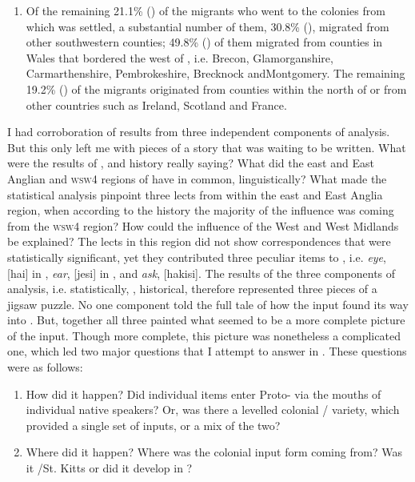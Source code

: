 \begin{enumerate}
\item{Of the remaining 21.1\% ()  of the migrants who went to the colonies from which  was settled, a substantial number of them, 30.8\% (), migrated from other southwestern counties; 49.8\% () of them migrated from counties in Wales that bordered the west of , i.e. Brecon, Glamorganshire, Carmarthenshire, Pembrokeshire, Brecknock and\linebreak Montgomery. The remaining 19.2\% () of the migrants originated from counties within the north of  or from other countries such as Ireland, Scotland and France.}
\end{enumerate}

I had corroboration of results from three independent components of analysis. But this only left me with pieces of a story that was waiting to be written. What were the results of ,  and history really saying? What did the east and East Anglian and \textsc{wsw4} regions of  have in common, linguistically? What made the statistical analysis pinpoint three lects from within the east and East Anglia region, when according to the history the majority of the  influence was coming from the \textsc{wsw4}  region? How could the influence of the West and West Midlands be explained? The lects in this region did not show correspondences that were statistically significant, yet they contributed three peculiar items to , i.e. \emph{eye}, [hai] in , \emph{ear}, [jesi] in , and \emph{ask}, [hakisi].
The results of the three components of analysis, i.e. statistically, , historical, therefore represented three pieces of a jigsaw puzzle. No one component told the full tale of how the  input found its way into . But, together all three painted what seemed to be a more complete picture of the input. Though more complete, this picture was nonetheless a complicated one, which led two major questions that I attempt to answer in . These questions were as follows:

\begin{enumerate}
\item{How did it happen? Did individual items enter Proto- via the mouths of individual native  speakers? Or, was there a levelled colonial / variety, which provided a single set of inputs, or a mix of the two?}
\item{Where did it happen? Where was the colonial  input form coming from? Was it /St. Kitts or did it develop in ?}
\end{enumerate}
